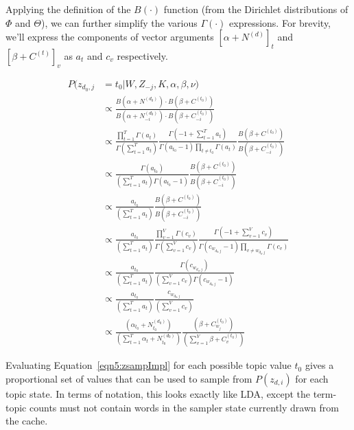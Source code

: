 
Applying the definition of the $B(\cdot)$ function (from the Dirichlet distributions of $\Phi$ and $\Theta$), we can further simplify the various $\Gamma(\cdot)$ expressions.  For brevity, we'll express the components of vector arguments $[\alpha + N^{(d)}]_t$ and $[\beta + C^{(t)}]_v$ as $a_t$ and $c_v$ respectively.

\begin{align}
P(z_{d_0,j}&=t_0|W,Z_{-j},K,\alpha,\beta,\nu) \label{zsampImpl} \\
&\propto \frac{B\left(\alpha +  N^{(d_0)}\right) \cdot B\left(\beta + C^{(t_0)}\right) }{ B\left(\alpha +  N^{(d_0)}_{-i}\right) \cdot B\left(\beta + C^{(t_0)}_{-i}\right)} \label{sampler2} \\
&\propto \frac{\prod_{t=1}^T \Gamma(a_t)}{\Gamma\left(\sum_{t=1}^T a_t \right)} \frac{\Gamma\left(-1+\sum_{t=1}^T a_t \right)}{\Gamma(a_{t_0}-1) \prod_{t\ne t_0} \Gamma(a_t)}
\frac{ B\left(\beta + C^{(t_0)}\right) }{ B\left(\beta + C^{(t_0)}_{-i}\right)}\\
&\propto \frac{\Gamma(a_{t_0})}{\left(\sum_{t=1}^T a_t \right)\Gamma(a_{t_0}-1)} \frac{ B\left(\beta + C^{(t_0)}\right) }{ B\left(\beta + C^{(t_0)}_{-i}\right)}\\
&\propto \frac{a_{t_0}}{\left(\sum_{t=1}^T a_t \right)} \frac{ B\left(\beta + C^{(t_0)}\right) }{ B\left(\beta + C^{(t_0)}_{-i}\right)} \\
&\propto \frac{a_{t_0}}{\left(\sum_{t=1}^T a_t \right)} \frac{\prod_{v=1}^V \Gamma(c_v)}{\Gamma\left(\sum_{v=1}^V c_v \right)} \frac{\Gamma\left(-1 + \sum_{v=1}^V c_v\right)}{\Gamma(c_{w_{d_0,j}}-1)\prod_{v\ne w_{d_0,j}} \Gamma(c_v)} \\
&\propto \frac{a_{t_0}}{\left(\sum_{t=1}^T a_t \right)} \frac{ \Gamma(c_{w_{d_0,j}})}{\left(\sum_{v=1}^V c_v \right)\Gamma(c_{w_{d_0,j}}-1)} \\
&\propto \frac{a_{t_0}}{\left(\sum_{t=1}^T a_t \right)} \frac{ c_{w_{d_0,j}}}{\left(\sum_{v=1}^V c_v \right)} \\
&\propto \frac{(\alpha_{t_0}+N^{(d_0)}_{t_0})}{\left(\sum_{t=1}^T \alpha_{t}+N^{(d_0)}_{t_0} \right)} \frac{(\beta +C^{(t_0)}_{w_j})}{\left(\sum_{v=1}^V \beta+C^{(t_0)}_{v} \right)} \label{eqn5:zsampImpl}
\end{align}

Evaluating Equation~\ref{eqn5:zsampImpl} for each possible topic value $t_0$ gives a proportional set of values that can be used to sample from $P(z_{d,i})$ for each topic state.  In terms of notation, this looks exactly like LDA, except the term-topic counts must not contain words in the sampler state currently drawn from the cache.

